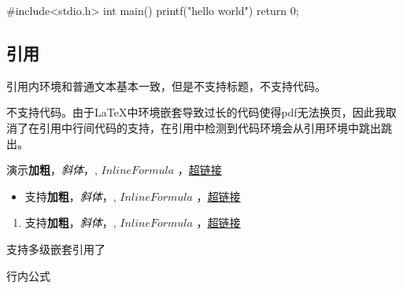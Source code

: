 \documentclass{article}%
\begin{document}
%
\begin{langbox}[C++]%
#include<stdio.h>%
int main(){%
printf("hello world")%
return 0;%
}%
%
\end{langbox}%
%

%
\subsection{引用}%

%
\begin{markquote}%
引用内环境和普通文本基本一致，但是不支持标题，不支持代码。%

%
不支持代码。由于LaTeX中环境嵌套导致过长的代码使得pdf无法换页，因此我取消了在引用中行间代码的支持，在引用中检测到代码环境会从引用环境中跳出跳出。%

%
演示\textbf{加粗}，\textit{斜体}，, $Inline Formula$ ，\href{www.github.com}{超链接}%

%
\begin{itemize}%
\item%
支持\textbf{加粗}，\textit{斜体}，, $Inline Formula$ ，\href{www.github.com}{超链接}%
\end{itemize}%

%
\begin{enumerate}%
\item%
支持\textbf{加粗}，\textit{斜体}，, $Inline Formula$ ，\href{www.github.com}{超链接}%
\end{enumerate}%

%

%

%
\begin{markquote}%
支持多级嵌套引用了%

%
\begin{markquote}%
 $\text{行内公式}$ %

%
\end{markquote}%

%

%

%
\end{markquote}%

%

%

%
\end{markquote}%
%
\end{document}
